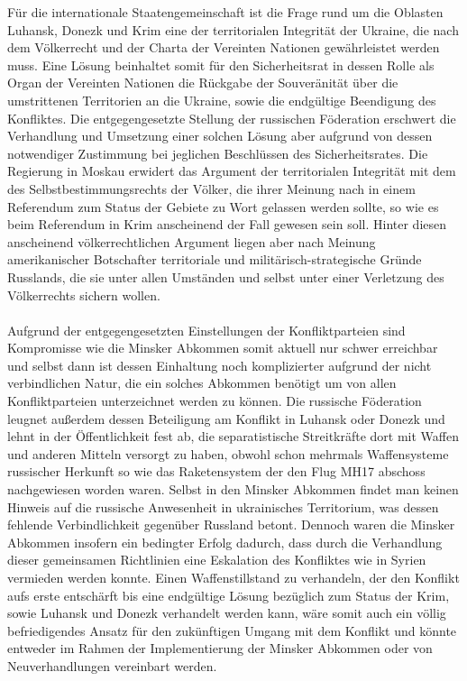 \documentclass[a4paper,11pt]{article}
\begin{document}
Für die internationale Staatengemeinschaft ist die Frage rund um die Oblasten Luhansk, Donezk und Krim eine der territorialen Integrität der Ukraine, die nach dem Völkerrecht und der Charta der Vereinten Nationen gewährleistet werden muss. Eine Lösung beinhaltet somit für den Sicherheitsrat in dessen Rolle als Organ der Vereinten Nationen die Rückgabe der Souveränität über die umstrittenen Territorien an die Ukraine, sowie die endgültige Beendigung des Konfliktes. Die entgegengesetzte Stellung der russischen Föderation erschwert die Verhandlung und Umsetzung einer solchen Lösung aber aufgrund von dessen notwendiger Zustimmung bei jeglichen Beschlüssen des Sicherheitsrates. Die Regierung in Moskau erwidert das Argument der territorialen Integrität mit dem des Selbstbestimmungsrechts der Völker, die ihrer Meinung nach in einem Referendum zum Status der Gebiete zu Wort gelassen werden sollte, so wie es beim Referendum in Krim anscheinend der Fall gewesen sein soll. Hinter diesen anscheinend völkerrechtlichen Argument liegen aber nach Meinung amerikanischer Botschafter territoriale und militärisch-strategische Gründe Russlands, die sie unter allen Umständen und selbst unter einer Verletzung des Völkerrechts sichern wollen. \\ \\ Aufgrund der entgegengesetzten Einstellungen der Konfliktparteien sind Kompromisse wie die Minsker Abkommen somit aktuell nur schwer erreichbar und selbst dann ist dessen Einhaltung noch komplizierter aufgrund der nicht verbindlichen Natur, die ein solches Abkommen benötigt um von allen Konfliktparteien unterzeichnet werden zu können. Die russische Föderation leugnet außerdem dessen Beteiligung am Konflikt in Luhansk oder Donezk und lehnt in der Öffentlichkeit fest ab, die separatistische Streitkräfte dort mit Waffen und anderen Mitteln versorgt zu haben, obwohl schon mehrmals Waffensysteme russischer Herkunft so wie das Raketensystem der den Flug MH17 abschoss nachgewiesen worden waren. Selbst in den Minsker Abkommen findet man keinen Hinweis auf die russische Anwesenheit in ukrainisches Territorium, was dessen fehlende Verbindlichkeit gegenüber Russland betont. Dennoch waren die Minsker Abkommen insofern ein bedingter Erfolg dadurch, dass durch die Verhandlung dieser gemeinsamen Richtlinien eine Eskalation des Konfliktes wie in Syrien vermieden werden konnte. Einen Waffenstillstand zu verhandeln, der den Konflikt aufs erste entschärft bis eine endgültige Lösung bezüglich zum Status der Krim, sowie Luhansk und Donezk verhandelt werden kann, wäre somit auch ein völlig befriedigendes Ansatz für den zukünftigen Umgang mit dem Konflikt und könnte entweder im Rahmen der Implementierung der Minsker Abkommen oder von Neuverhandlungen vereinbart werden. \\ \\
      
\end{document}
